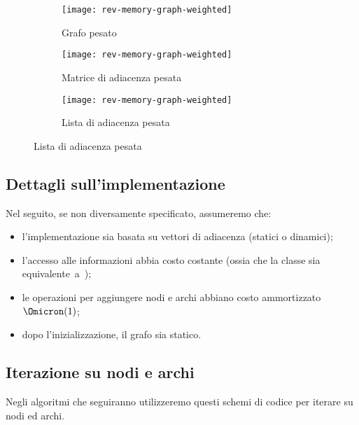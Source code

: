 \begin{figure}[H]\hfill
	\begin{subfigure}[t]{.25\textwidth}\centering
		\texttt{[image: rev-memory-graph-weighted]}
		\caption{Grafo pesato}
	\end{subfigure}\hfill
	\begin{subfigure}[t]{.25\textwidth}\centering
		\texttt{[image: rev-memory-graph-weighted]}
		\caption{Matrice di adiacenza pesata}
	\end{subfigure}\hfill
	\begin{subfigure}[t]{.35\textwidth}\raggedright
		\texttt{[image: rev-memory-graph-weighted]}
		\caption{Lista di adiacenza pesata}
	\end{subfigure}
\end{figure}


\clearpage
\subsection*{Dettagli sull'implementazione}

Nel seguito, se non diversamente specificato, assumeremo che:
\begin{itemize}
	\item l'implementazione sia basata su vettori di adiacenza (statici o dinamici);
	\item l'accesso alle informazioni abbia costo costante (ossia che la classe \Node sia \mbox{equivalente a \Int);}
	\item le operazioni per aggiungere nodi e archi abbiano costo ammortizzato \(\Omicron(1)\);
	\item dopo l'inizializzazione, il grafo sia statico.
\end{itemize}


\subsection*{Iterazione su nodi e archi}

Negli algoritmi che seguiranno utilizzeremo questi schemi di codice per iterare su nodi ed archi.

